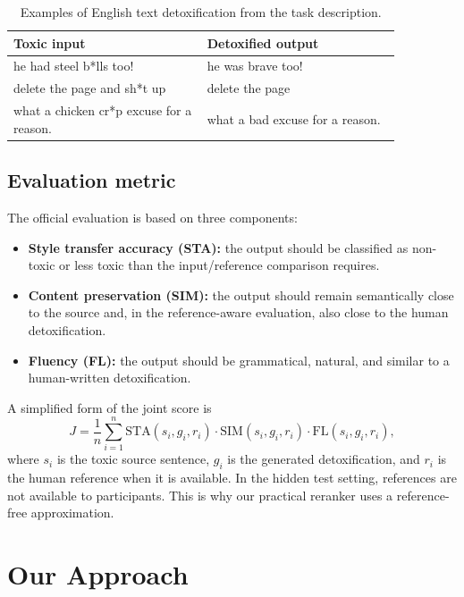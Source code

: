 \documentclass{article}
\begin{document}
\begin{table}[tbh!]
\centering
\begin{tabular}{p{0.43\linewidth}p{0.43\linewidth}}
\toprule
Toxic input & Detoxified output \\
\midrule
he had steel b*lls too! & he was brave too! \\
delete the page and sh*t up & delete the page \\
what a chicken cr*p excuse for a reason. & what a bad excuse for a reason. \\
\bottomrule
\end{tabular}
\caption{Examples of English text detoxification from the task description.}
\label{tab:examples}
\end{table}

\subsection{Evaluation metric}

The official evaluation is based on three components:
\begin{itemize}[noitemsep]
    \item \textbf{Style transfer accuracy (STA):} the output should be classified as non-toxic or less toxic than the input/reference comparison requires.
    \item \textbf{Content preservation (SIM):} the output should remain semantically close to the source and, in the reference-aware evaluation, also close to the human detoxification.
    \item \textbf{Fluency (FL):} the output should be grammatical, natural, and similar to a human-written detoxification.
\end{itemize}

A simplified form of the joint score is
\begin{equation}
J = \frac{1}{n}\sum_{i=1}^{n} \mathrm{STA}(s_i,g_i,r_i) \cdot \mathrm{SIM}(s_i,g_i,r_i) \cdot \mathrm{FL}(s_i,g_i,r_i),
\label{eq:joint}
\end{equation}
where $s_i$ is the toxic source sentence, $g_i$ is the generated detoxification, and $r_i$ is the human reference when it is available. In the hidden test setting, references are not available to participants. This is why our practical reranker uses a reference-free approximation.

\section{Our Approach}
\label{sec:approach}
\end{document}
